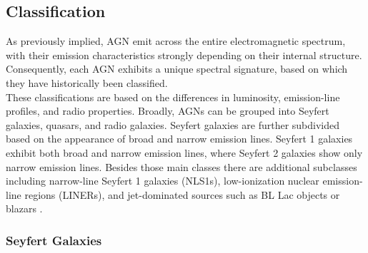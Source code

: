 \subsection{Classification}
\label{sec:classification}
As previously implied, AGN emit across the entire electromagnetic spectrum, with their emission characteristics strongly depending on their internal structure. Consequently, each AGN exhibits a unique spectral signature, based on which they have historically been classified.\\
These classifications are based on the differences in luminosity, emission-line profiles, and radio properties. Broadly, AGNs can be grouped into Seyfert galaxies, quasars, and radio galaxies. Seyfert galaxies are further subdivided based on the appearance of broad and narrow emission lines. Seyfert 1 galaxies exhibit both broad and narrow emission lines, where Seyfert 2 galaxies show only narrow emission lines. Besides those main classes there are additional subclasses including narrow-line Seyfert 1 galaxies (NLS1s), low-ionization nuclear emission-line regions (LINERs), and jet-dominated sources such as BL Lac objects or blazars \parencite{antonucci1993unified, urry1995unified}.


\subsubsection{Seyfert Galaxies}

